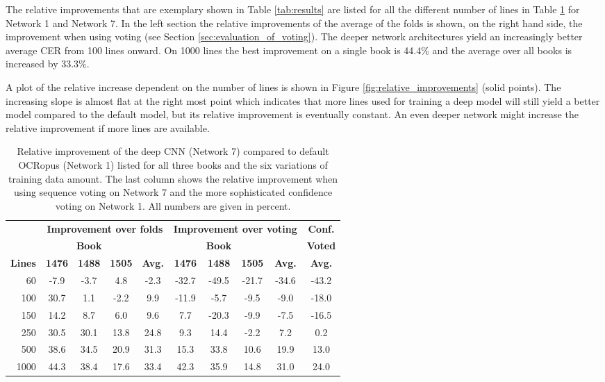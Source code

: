 \documentclass{jlcl}
\begin{document}
\begin{table}[tp]
\begin{tabular}{c|l|ccccc|cc|cc}
    \end{tabular}
\end{table}

The relative improvements that are exemplary shown in Table \ref{tab:results} are listed for all the different number of lines in Table \ref{tab:improvements} for Network 1 and Network 7.
In the left section the relative improvements of the average of the folds is shown, on the right hand side, the improvement when using voting (see Section \ref{sec:evaluation_of_voting}).
The deeper network architectures yield an increasingly better average CER from 100 lines onward.
On 1000 lines the best improvement on a single book is 44.4\% and the average over all books is increased by 33.3\%.

A plot of the relative increase dependent on the number of lines is shown in Figure \ref{fig:relative_improvements} (solid points).
The increasing slope is almost flat at the right most point which indicates that more lines used for training a deep model will still yield a better model compared to the default model, but its relative improvement is eventually constant.
An even deeper network might increase the relative improvement if more lines are available.

\begin{table}[t]
    \centering
    \caption{Relative improvement of the deep CNN (Network 7) compared to default OCRopus (Network 1) listed for all three books and the six variations of training data amount.
    The last column shows the relative improvement when using sequence voting on Network 7 and the more sophisticated confidence voting on Network 1.
    All numbers are given in percent.}
    \label{tab:improvements}
    \begin{tabular}{r|ccc|c|ccc|c||c}
        \hline
              & \multicolumn{4}{c|}{\textbf{Improvement over folds}} & \multicolumn{4}{c||}{\textbf{Improvement over voting}} & \textbf{Conf.} \\
              & \multicolumn{3}{c|}{\textbf{Book}} & & \multicolumn{3}{c|}{\textbf{Book}} & & \textbf{Voted} \\
        \textbf{Lines} & \textbf{1476} & \textbf{1488} & \textbf{1505} & \textbf{Avg.} & \textbf{1476} & \textbf{1488} & \textbf{1505} & \textbf{Avg.} & \textbf{Avg.} \\
        \hline
           60 & -7.9 & -3.7 &  4.8 & -2.3 & -32.7 & -49.5 & -21.7 & -34.6 & -43.2 \\
          100 & 30.7 & 1.1  & -2.2 &  9.9 & -11.9 &  -5.7 &  -9.5 &  -9.0 & -18.0 \\
          150 & 14.2 & 8.7  &  6.0 &  9.6 &   7.7 & -20.3 &  -9.9 &  -7.5 & -16.5 \\
          250 & 30.5 & 30.1 & 13.8 & 24.8 &   9.3 &  14.4 &  -2.2 &   7.2 &   0.2 \\
          500 & 38.6 & 34.5 & 20.9 & 31.3 &  15.3 &  33.8 &  10.6 &  19.9 &  13.0 \\
         1000 & 44.3 & 38.4 & 17.6 & 33.4 &  42.3 &  35.9 &  14.8 &  31.0 &  24.0 \\
         \hline
    \end{tabular}
\end{table}
\end{document}
